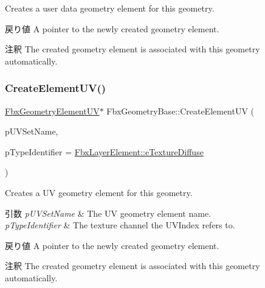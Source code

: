 Creates a user data geometry element for this geometry. \begin{DoxyReturn}{戻り値}
A pointer to the newly created geometry element. 
\end{DoxyReturn}
\begin{DoxyRemark}{注釈}
The created geometry element is associated with this geometry automatically. 
\end{DoxyRemark}
\mbox{\label{class_fbx_geometry_base_ac2d647f718a69776037377e79dfc8c3e}} 
\subsubsection{\texorpdfstring{Create\+Element\+U\+V()}{CreateElementUV()}}
{\footnotesize\ttfamily \hyperlink{fbxlayer_8h_a12413531f4bb2c482e3ddbd59e3417e5}{Fbx\+Geometry\+Element\+UV}$\ast$ Fbx\+Geometry\+Base\+::\+Create\+Element\+UV (\begin{DoxyParamCaption}\item[{const char $\ast$}]{p\+U\+V\+Set\+Name,  }\item[{\hyperlink{class_fbx_layer_element_a8c95c5cd880b56c776acd379bd86f42c}{Fbx\+Layer\+Element\+::\+E\+Type}}]{p\+Type\+Identifier = {\ttfamily \hyperlink{class_fbx_layer_element_a8c95c5cd880b56c776acd379bd86f42ca09829e6ecf512e7ae04d9ad8de1342fa}{Fbx\+Layer\+Element\+::e\+Texture\+Diffuse}} }\end{DoxyParamCaption})}

Creates a UV geometry element for this geometry. 
\begin{DoxyParams}{引数}
{\em p\+U\+V\+Set\+Name} & The UV geometry element name. \\
\hline
{\em p\+Type\+Identifier} & The texture channel the U\+V\+Index refers to. \\
\hline
\end{DoxyParams}
\begin{DoxyReturn}{戻り値}
A pointer to the newly created geometry element. 
\end{DoxyReturn}
\begin{DoxyRemark}{注釈}
The created geometry element is associated with this geometry automatically. 
\end{DoxyRemark}
\mbox{\label{class_fbx_geometry_base_a866f39f540f6bc9ca8e529f27d9ebee4}} 
